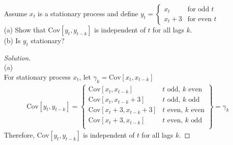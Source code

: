 \documentclass[UTF8,a4paper,14pt]{ctexart}
\newcommand{\Cov}{\mathrm{Cov}}
\newenvironment{solution}
  {\renewcommand\qedsymbol{$\blacksquare$}\begin{proof}[Solution]}
  {\end{proof}}
\theoremstyle{definition}
\theoremstyle{remark}
\begin{document}
\begin{Problem}{}
    Assume $x_t$ is a stationary process and define $y_t = \begin{cases}
        x_t &\text{for odd $t$}\\
        x_t +3 &\text{for even $t$}
    \end{cases}$\\[6pt]
(a) Show that $\Cov[y_t,y_{t-k}]$ is independent of $t$ for all lags $k$.\\
(b) Is $y_t$ stationary?
\end{Problem} 

\begin{solution}\,\\
    (a)\\
    For stationary process $x_t$, let \(\gamma_k = \Cov[x_t,x_{t-k}]\)\\
    \begin{align*}
        \Cov[y_t,y_{t-k}] = \left\{\begin{array}{lc}
            \Cov[x_t,x_{t-k}]  &\text{$t$ odd, $k$ even}\\
            \Cov[x_t,x_{t-k}+3] &\text{$t$ odd, $k$ odd}\\
            \Cov[x_t+3,x_{t-k}+3]  &\text{$t$ even, $k$ even}\\
            \Cov[x_t+3,x_{t-k}]  &\text{$t$ even, $k$ odd}\\
        \end{array}\right\} = \gamma_k
    \end{align*}
    Therefore, $\Cov[y_t,y_{t-k}]$ is independent of $t$ for all lags $k$.


\end{solution}
\end{document}
